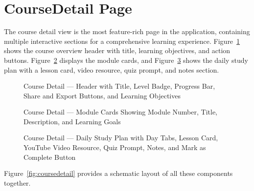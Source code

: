 \documentclass[12pt,a4paper]{report}
\begin{document}
\section{CourseDetail Page}
The course detail view is the most feature-rich page in the application, containing multiple interactive sections for a comprehensive learning experience. Figure~\ref{fig:course-header} shows the course overview header with title, learning objectives, and action buttons. Figure~\ref{fig:course-modules} displays the module cards, and Figure~\ref{fig:daily-plan} shows the daily study plan with a lesson card, video resource, quiz prompt, and notes section.

\begin{figure}[H]
    \centering
    \caption{Course Detail --- Header with Title, Level Badge, Progress Bar, Share and Export Buttons, and Learning Objectives}
    \label{fig:course-header}
\end{figure}

\begin{figure}[H]
    \centering
    \caption{Course Detail --- Module Cards Showing Module Number, Title, Description, and Learning Goals}
    \label{fig:course-modules}
\end{figure}

\begin{figure}[H]
    \centering
    \caption{Course Detail --- Daily Study Plan with Day Tabs, Lesson Card, YouTube Video Resource, Quiz Prompt, Notes, and Mark as Complete Button}
    \label{fig:daily-plan}
\end{figure}

Figure~\ref{fig:coursedetail} provides a schematic layout of all these components together.
\end{document}
